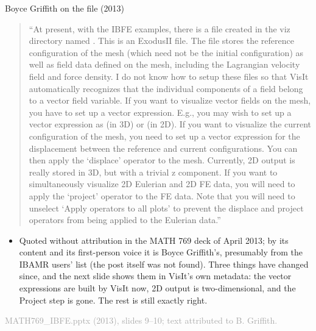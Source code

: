 \documentclass[aspectratio=169,11pt]{beamer}
\newcommand{\sourcecredit}[1]{\vfill\begin{flushright}\tiny\textcolor{DarkGray}{#1}\end{flushright}}
\begin{document}
\begin{frame}{Boyce Griffith on the file (2013)}
\label{fr:griffith}
\footnotesize
\begin{quote}
\scriptsize ``At present, with the IBFE examples, there is a file created in the viz directory named . This is an ExodusII file. The file stores the reference configuration of the mesh (which need not be the initial configuration) as well as field data defined on the mesh, including the Lagrangian velocity field and force density. I do not know how to setup these files so that VisIt automatically recognizes that the individual components of a field belong to a vector field variable. If you want to visualize vector fields on the mesh, you have to set up a vector expression. E.g., you may wish to set up a vector expression  as  (in 3D) or  (in 2D). If you want to visualize the current configuration of the mesh, you need to set up a vector expression  for the displacement between the reference and current configurations. You can then apply the `displace' operator to the mesh. Currently, 2D output is really stored in 3D, but with a trivial z component. If you want to simultaneously visualize 2D Eulerian and 2D FE data, you will need to apply the `project' operator to the FE data. Note that you will need to unselect `Apply operators to all plots' to prevent the displace and project operators from being applied to the Eulerian data.''
\end{quote}
\begin{itemize}
  \item Quoted without attribution in the MATH 769 deck of April 2013; by its content and its first-person voice it is Boyce Griffith's, presumably from the IBAMR users' list (the post itself was not found). Three things have changed since, and the next slide shows them in VisIt's own metadata: the vector expressions are built by VisIt now, 2D output is two-dimensional, and the Project step is gone. The rest is still exactly right.
\end{itemize}
\sourcecredit{MATH769\_IBFE.pptx (2013), slides 9--10; text attributed to B. Griffith.}
\end{frame}
\end{document}
